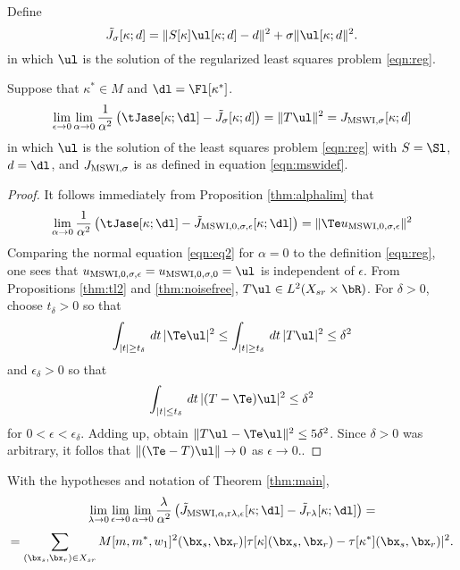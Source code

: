 Define
\begin{equation}
  \label{eqn:tj0def}
  \tilde{J}_{\sigma}[\kappa;d] = \|S[\kappa]\ul[\kappa;d] - d\|^2 + \sigma\|\ul[\kappa;d\|^2.
\end{equation}
in which $\ul$ is the solution of the regularized least squares
problem \ref{eqn:reg}. 

\begin{prop}
  \label{thm:MSWIepsalphalim}
Suppose that $\kappa^* \in M$ and $\dl=\Fl[\kappa^*]$.
\begin{equation}
  \label{eqn:eq7}
  \lim_{\epsilon \rightarrow 0}\lim_{\alpha \rightarrow 0}
  \frac{1}{\alpha^2}\left(\tJase[\kappa;\dl]-\tilde{J}_{\sigma}[\kappa;d]\right)=
 \|T\ul\|^2 =  J_{\rm MSWI,\sigma}[\kappa;d]
\end{equation}
in which $\ul$ is the solution of the least squares problem
\ref{eqn:reg} with $S=\Sl$, $d=\dl$, and $J_{\rm MSWI,\sigma}$ is as
defined in equation \ref{eqn:mswidef}.
\end{prop}

\begin{proof}
  It follows immediately from Proposition \ref{thm:alphalim} that
  \[
    \lim_{\alpha \rightarrow 0}
    \frac{1}{\alpha^2}\left(\tJase[\kappa;\dl]-\tilde{J}_{\rm MSWI,0,\sigma,\epsilon}[\kappa;\dl]\right)=
    \|\Te u_{\rm MSWI,0,\sigma,\epsilon}\|^2
  \]
  Comparing the normal equation \ref{eqn:eq2} for $\alpha=0$
  to the definition \ref{eqn:reg}, one sees that  $u_{\rm
    MSWI,0,\sigma,\epsilon} = u_{\rm MSWI,0,\sigma,0} = \ul$ is
  independent of $\epsilon$. From
  Propositions \ref{thm:tl2} and \ref{thm:noisefree}, $T\ul \in
  L^2(X_{sr} \times \bR)$. For $\delta>0$, choose $t_{\delta} > 0$ so
  that
  \[
    \int_{|t| \ge t_{\delta}} \,dt\, |\Te \ul|^2 \le  \int_{|t| \ge
      t_{\delta}} \,dt\, |T \ul|^2 \le \delta^2
  \]
  and $\epsilon_{\delta}>0$ so that
  \[
    \int_{|t| \le t_{\delta}} \,dt\, |(T-\Te) \ul|^2 \le \delta^2
  \]
  for $0<\epsilon<\epsilon_{\delta}$. Adding up, obtain $\|T\ul
  -\Te\ul\|^2 \le 5\delta^2$. Since $\delta>0$ was arbitrary, it
  follos that $\|(\Te -T)\ul\| \rightarrow 0$ as $\epsilon \rightarrow
  0$..
\end{proof}

\begin{cor}
  \label{thm:cor2}
  With the hypotheses and notation of Theorem \ref{thm:main},
  \[
    \lim_{\lambda \rightarrow 0}\lim_{\epsilon \rightarrow 0}\lim_{\alpha \rightarrow 0}
  \frac{\lambda}{\alpha^2}\left(\tilde{J}_{\rm MSWI,\alpha,r\lambda,\epsilon}[\kappa;\dl]-\tilde{J}_{r\lambda}[\kappa;\dl]\right)=
  \]
  \begin{equation}
    \label{eqn:main1}
    = \sum_{(\bx_s,\bx_r) \in X_{sr}}
    M[m,m^*,w_1]^2(\bx_s,\bx_r) |\tau[\kappa](\bx_s,\bx_r) -
    \tau[\kappa^*](\bx_s,\bx_r)|^2.
  \end{equation}
\end{cor}

